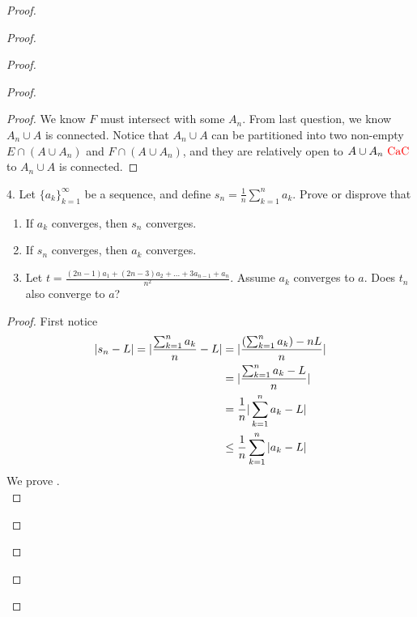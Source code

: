\documentclass{report}
\begin{document}
\begin{proof}
\begin{proof}
\begin{proof}
\begin{proof}
\begin{proof}
We know $F$ must intersect with some  $A_n$. From last question, we know $A_n\cup A$ is connected. Notice that $A_n\cup A$ can be partitioned into two non-empty $E\cap (A\cup A_n)$ and $F\cap (A\cup A_n)$, and they are relatively open to $A\cup A_n\text{ \textcolor{red}{CaC} }$ to $A_n\cup A$ is connected.
\end{proof}
\begin{question}{}{}
4. Let $\{a_k\}_{k=1}^{\infty}$ be a sequence, and define $s_n = \frac{1}{n} \sum_{k=1}^{n} a_k$. Prove or disprove that
\begin{enumerate}[label=(\alph*)]
  \item If ${a_k}$ converges, then $s_n$ converges.\\
  \item If $s_n$ converges, then $a_k$ converges.\\
  \item Let $t = \frac{(2n-1)a_1 + (2n-3)a_2 + \ldots + 3a_{n-1} + a_n}{n^2}$. Assume ${a_k}$ converges to $a$. Does $t_n$ also converge to $a$?
\end{enumerate}
\end{question}
\begin{proof}
First notice
\begin{align}
  |s_n-L|=|\frac{\sum_{k=1}^n a_k}{n}-L|&=|\frac{(\sum_{k=1}^na_k)-nL}{n}|\\
  &=|\frac{\sum _{k=1}^n a_k-L}{n}|\\
  &=\frac{1}{n}|\sum_{k=1}^n a_k-L|\\
  &\leq \frac{1}{n} \sum_{k=1}^n |a_k-L|
\end{align}
We prove .\\


\end{proof}
\end{proof}
\end{proof}
\end{proof}
\end{proof}
\end{document}
